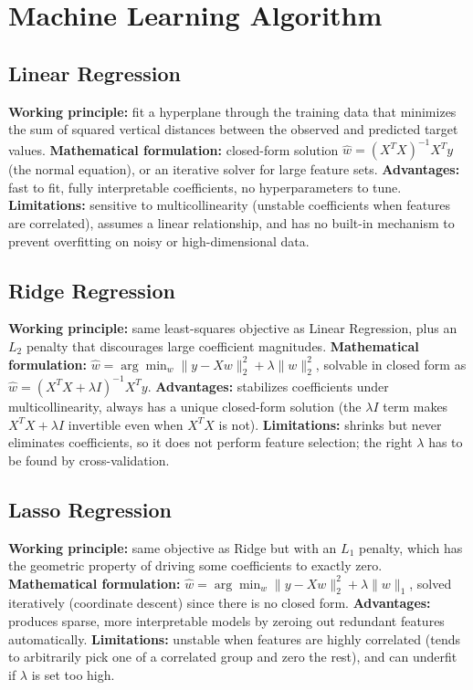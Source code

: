 \documentclass[11pt,a4paper]{article}
\begin{document}
\section{Machine Learning Algorithm}

\subsection{Linear Regression}
\textbf{Working principle:} fit a hyperplane through the training data that minimizes the sum of squared vertical distances between the observed and predicted target values.
\textbf{Mathematical formulation:} closed-form solution $\hat w = (X^TX)^{-1}X^Ty$ (the normal equation), or an iterative solver for large feature sets.
\textbf{Advantages:} fast to fit, fully interpretable coefficients, no hyperparameters to tune.
\textbf{Limitations:} sensitive to multicollinearity (unstable coefficients when features are correlated), assumes a linear relationship, and has no built-in mechanism to prevent overfitting on noisy or high-dimensional data.

\subsection{Ridge Regression}
\textbf{Working principle:} same least-squares objective as Linear Regression, plus an $L_2$ penalty that discourages large coefficient magnitudes.
\textbf{Mathematical formulation:} $\hat w = \arg\min_w \lVert y - Xw \rVert_2^2 + \lambda \lVert w \rVert_2^2$, solvable in closed form as $\hat w = (X^TX + \lambda I)^{-1}X^Ty$.
\textbf{Advantages:} stabilizes coefficients under multicollinearity, always has a unique closed-form solution (the $\lambda I$ term makes $X^TX+\lambda I$ invertible even when $X^TX$ is not).
\textbf{Limitations:} shrinks but never eliminates coefficients, so it does not perform feature selection; the right $\lambda$ has to be found by cross-validation.

\subsection{Lasso Regression}
\textbf{Working principle:} same objective as Ridge but with an $L_1$ penalty, which has the geometric property of driving some coefficients to exactly zero.
\textbf{Mathematical formulation:} $\hat w = \arg\min_w \lVert y - Xw \rVert_2^2 + \lambda \lVert w \rVert_1$, solved iteratively (coordinate descent) since there is no closed form.
\textbf{Advantages:} produces sparse, more interpretable models by zeroing out redundant features automatically.
\textbf{Limitations:} unstable when features are highly correlated (tends to arbitrarily pick one of a correlated group and zero the rest), and can underfit if $\lambda$ is set too high.
\end{document}
